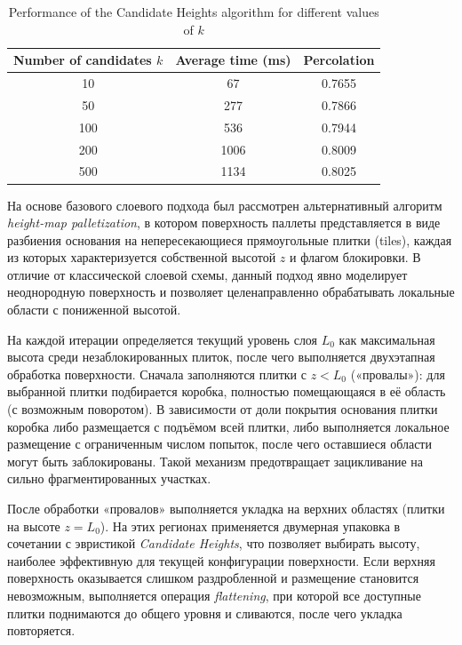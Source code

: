 \begin{table}[H]
\centering
\caption{Performance of the Candidate Heights algorithm for different values of $k$}
\label{tab:candidate_heights_results}
\begin{tabular}{|c|c|c|}
\hline
Number of candidates $k$ & Average time (ms) & Percolation \\ \hline
10 & 67 & 0.7655 \\ \hline
50 & 277 & 0.7866 \\ \hline
100 & 536 & 0.7944 \\ \hline
200 & 1006 & 0.8009 \\ \hline
500 & 1134 & 0.8025 \\ \hline
\end{tabular}
\end{table}

На основе базового слоевого подхода был рассмотрен альтернативный алгоритм \emph{height-map palletization}, в котором поверхность паллеты представляется в виде разбиения основания на непересекающиеся прямоугольные плитки (tiles), каждая из которых характеризуется собственной высотой $z$ и флагом блокировки. В отличие от классической слоевой схемы, данный подход явно моделирует неоднородную поверхность и позволяет целенаправленно обрабатывать локальные области с пониженной высотой.

На каждой итерации определяется текущий уровень слоя $L_0$ как максимальная высота среди незаблокированных плиток, после чего выполняется двухэтапная обработка поверхности. Сначала заполняются плитки с $z < L_0$ («провалы»): для выбранной плитки подбирается коробка, полностью помещающаяся в её область (с возможным поворотом). В зависимости от доли покрытия основания плитки коробка либо размещается с подъёмом всей плитки, либо выполняется локальное размещение с ограниченным числом попыток, после чего оставшиеся области могут быть заблокированы. Такой механизм предотвращает зацикливание на сильно фрагментированных участках.

После обработки «провалов» выполняется укладка на верхних областях (плитки на высоте $z = L_0$). На этих регионах применяется двумерная упаковка в сочетании с эвристикой \textit{Candidate Heights}, что позволяет выбирать высоту, наиболее эффективную для текущей конфигурации поверхности. Если верхняя поверхность оказывается слишком раздробленной и размещение становится невозможным, выполняется операция \emph{flattening}, при которой все доступные плитки поднимаются до общего уровня и сливаются, после чего укладка повторяется.

